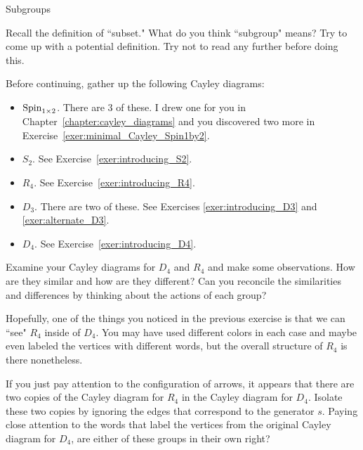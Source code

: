 \begin{section}{Subgroups}\label{sec:intuitive_subgroups}

\begin{exercise}
Recall the definition of ``subset."  What do you think ``subgroup" means?  Try to come up with a potential definition.  Try not to read any further before doing this.
\end{exercise}

Before continuing, gather up the following Cayley diagrams:
\begin{itemize}
\item $\operatorname{Spin}_{1\times 2}$. There are 3 of these.  I drew one for you in Chapter~\ref{chapter:cayley_diagrams} and you discovered two more in Exercise~\ref{exer:minimal_Cayley_Spin1by2}.
\item $S_2$.  See Exercise~\ref{exer:introducing_S2}.
\item $R_4$.  See Exercise~\ref{exer:introducing_R4}.
\item $D_3$.  There are two of these.  See Exercises \ref{exer:introducing_D3} and \ref{exer:alternate_D3}.
\item $D_4$.  See Exercise~\ref{exer:introducing_D4}.
\end{itemize}

\begin{exercise}\label{exer:R4_in_D4}
Examine your Cayley diagrams for $D_4$ and $R_4$ and make some observations.  How are they similar and how are they different?  Can you reconcile the similarities and differences by thinking about the actions of each group?
\end{exercise}

Hopefully, one of the things you noticed in the previous exercise is that we can ``see" $R_4$ inside of $D_4$.  You may have used different colors in each case and maybe even labeled the vertices with different words, but the overall structure of $R_4$ is there nonetheless.

\begin{exercise}\label{exer:R4_subgroup_D_4}
If you just pay attention to the configuration of arrows, it appears that there are two copies of the Cayley diagram for $R_4$ in the Cayley diagram for $D_4$.  Isolate these two copies by ignoring the edges that correspond to the generator $s$.  Paying close attention to the words that label the vertices from the original Cayley diagram for $D_4$, are either of these groups in their own right?
\end{exercise}


\end{section}
